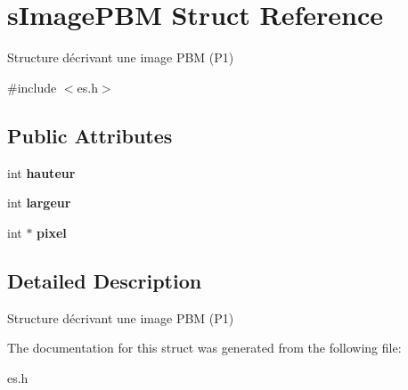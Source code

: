 \hypertarget{structs_image_p_b_m}{}\section{s\+Image\+P\+BM Struct Reference}
\label{structs_image_p_b_m}


Structure décrivant une image P\+BM (P1)  




{\ttfamily \#include $<$es.\+h$>$}

\subsection*{Public Attributes}
\begin{DoxyCompactItemize}
\item 
\mbox{\label{structs_image_p_b_m_aff8ecf2fea76d4a3cc707f6e44f71178}} 
int {\bfseries hauteur}
\item 
\mbox{\label{structs_image_p_b_m_a63e8395b6fef477836ca6e48ea9f00ba}} 
int {\bfseries largeur}
\item 
\mbox{\label{structs_image_p_b_m_acf5219dd8d6929f8b5d771a90a647710}} 
int $\ast$ {\bfseries pixel}
\end{DoxyCompactItemize}


\subsection{Detailed Description}
Structure décrivant une image P\+BM (P1) 

The documentation for this struct was generated from the following file\+:\begin{DoxyCompactItemize}
\item 
es.\+h\end{DoxyCompactItemize}

